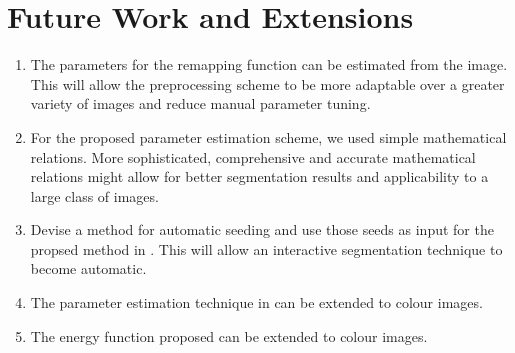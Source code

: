 \section{Future Work and Extensions}

\begin{enumerate}
	\item The parameters for the remapping function can be estimated from the image. This will allow the preprocessing scheme to be more adaptable over a greater variety of images and reduce manual parameter tuning.
	
	\item For the proposed parameter estimation scheme, we used simple mathematical relations. More sophisticated, comprehensive and accurate mathematical relations might allow for better segmentation results and applicability to a large class of images.
	
	\item Devise a method for automatic seeding and use those seeds as input for the propsed method in . This will allow an interactive segmentation technique to become automatic.
	
	\item The parameter estimation technique in  can be extended to colour images.
	
	\item The energy function proposed  can be extended to colour images.
\end{enumerate}

